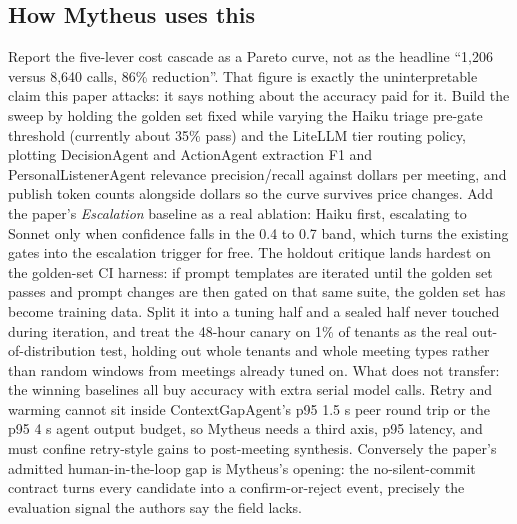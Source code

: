 \subsection{How Mytheus uses this}
\begin{takeaway}
Report the five-lever cost cascade as a Pareto curve, not as the headline ``1,206 versus 8,640 calls, 86\% reduction''. That figure is exactly the uninterpretable claim this paper attacks: it says nothing about the accuracy paid for it. Build the sweep by holding the golden set fixed while varying the Haiku triage pre-gate threshold (currently about 35\% pass) and the LiteLLM tier routing policy, plotting DecisionAgent and ActionAgent extraction F1 and PersonalListenerAgent relevance precision/recall against dollars per meeting, and publish token counts alongside dollars so the curve survives price changes. Add the paper's \textit{Escalation} baseline as a real ablation: Haiku first, escalating to Sonnet only when confidence falls in the 0.4 to 0.7 band, which turns the existing gates into the escalation trigger for free. The holdout critique lands hardest on the golden-set CI harness: if prompt templates are iterated until the golden set passes and prompt changes are then gated on that same suite, the golden set has become training data. Split it into a tuning half and a sealed half never touched during iteration, and treat the 48-hour canary on 1\% of tenants as the real out-of-distribution test, holding out whole tenants and whole meeting types rather than random windows from meetings already tuned on. What does not transfer: the winning baselines all buy accuracy with extra serial model calls. Retry and warming cannot sit inside ContextGapAgent's p95 1.5 s peer round trip or the p95 4 s agent output budget, so Mytheus needs a third axis, p95 latency, and must confine retry-style gains to post-meeting synthesis. Conversely the paper's admitted human-in-the-loop gap is Mytheus's opening: the no-silent-commit contract turns every candidate into a confirm-or-reject event, precisely the evaluation signal the authors say the field lacks.
\end{takeaway}

